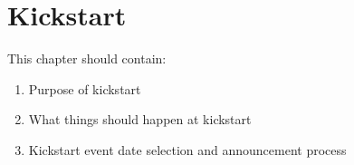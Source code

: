 \chapter{Kickstart}

This chapter should contain:
\begin{enumerate}
\item Purpose of kickstart
\item What things should happen at kickstart
\item Kickstart event date selection and announcement process
\end{enumerate}
